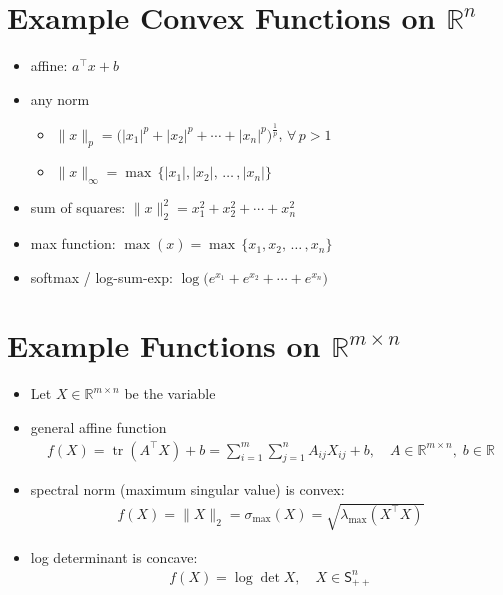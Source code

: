 \documentclass[11pt]{extarticle}
\newcommand{\ds}{\displaystyle}
\DeclareMathOperator*{\tr}{tr}
\theoremstyle{definition}
\begin{document}
\newpage

\section*{Example Convex Functions on $\mathbb{R}^n$}

\begin{itemize}
  \item affine: $\ds a^\top\!x + b$
  \item any norm 
    \begin{itemize}
      \item $\ds\|x\|_p = \big(|x_1|^p + |x_2|^p + \cdots + |x_n|^p\big)^{\frac{1}{p}}$, $\forall\,p > 1$
      \item $\ds\|x\|_\infty = \max\,\{|x_1|, |x_2|,\,\ldots\,,|x_n|\}$
    \end{itemize}
  \item sum of squares: $\ds\|x\|_2^2 = x_1^2 + x_2^2 + \cdots + x_n^2$
  \item max function: $\ds\max(x) = \max\,\{x_1, x_2,\,\ldots\,,x_n\}$
  \item softmax / log-sum-exp: $\ds\log\big(e^{x_1} + e^{x_2} + \cdots + e^{x_n}\big)$
\end{itemize}

\newpage

\section*{Example Functions on $\mathbb{R}^{m\times n}$}

\begin{itemize}
  \item Let $\ds X\in\mathbb{R}^{m\times n}$ be the variable
  \item general affine function
    \begin{align*}
      f(X) = \tr(A^\top X) + b = \sum_{i=1}^m\sum_{j=1}^n A_{ij} X_{ij} + b, \quad A\in\mathbb{R}^{m\times n},\;b\in\mathbb{R}
    \end{align*}
  \item spectral norm (maximum singular value) is convex: 
    \begin{align*}
      f(X) = \|X\|_2 = \sigma_{\text{max}}(X) = \sqrt{\lambda_{\text{max}}(X^\top X)}
    \end{align*}
  \item log determinant is concave:
    \begin{align*}
      f(X) = \log\det X, \quad X\in\mathsf{S}^n_{++}
    \end{align*}
\end{itemize}
\end{document}
